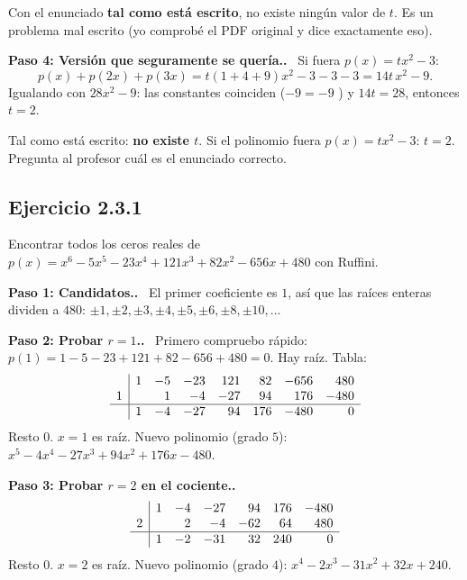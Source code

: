 \documentclass[11pt,a4paper]{article}
\newcommand{\paso}[1]{\par\medskip\noindent\textbf{\textcolor{blue!50!black}{Paso #1.}}\ }
\begin{document}
\begin{cuidado}
Con el enunciado \textbf{tal como está escrito}, no existe ningún valor de $t$. Es un problema mal escrito (yo comprobé el PDF original y dice exactamente eso).
\end{cuidado}

\paso{4: Versión que seguramente se quería.} Si fuera $p(x)=tx^2-3$:
\[ p(x)+p(2x)+p(3x)=t\left(1+4+9\right)x^2-3-3-3=14t\,x^2-9. \]
Igualando con $28x^2-9$: las constantes coinciden ($-9=-9$ \checkmark) y $14t=28$, entonces $t=2$.

\begin{respuesta}
Tal como está escrito: \textbf{no existe $t$}. Si el polinomio fuera $p(x)=tx^2-3$: $t=2$. Pregunta al profesor cuál es el enunciado correcto.
\end{respuesta}

\subsection{Ejercicio 2.3.1}
\begin{enunciado}
Encontrar todos los ceros reales de $p(x)=x^6-5x^5-23x^4+121x^3+82x^2-656x+480$ con Ruffini.
\end{enunciado}

\paso{1: Candidatos.} El primer coeficiente es $1$, así que las raíces enteras dividen a $480$:
$\pm1,\pm2,\pm3,\pm4,\pm5,\pm6,\pm8,\pm10,\dots$

\paso{2: Probar $r=1$.} Primero compruebo rápido: $p(1)=1-5-23+121+82-656+480=0$. Hay raíz. Tabla:
\[
\begin{array}{r|rrrrrrr}
 & 1 & -5 & -23 & 121 & 82 & -656 & 480\\
1 & & 1 & -4 & -27 & 94 & 176 & -480\\ \hline
 & 1 & -4 & -27 & 94 & 176 & -480 & 0
\end{array}
\]
Resto $0$. $x=1$ es raíz. Nuevo polinomio (grado $5$): $x^5-4x^4-27x^3+94x^2+176x-480$.

\paso{3: Probar $r=2$ en el cociente.}
\[
\begin{array}{r|rrrrrr}
 & 1 & -4 & -27 & 94 & 176 & -480\\
2 & & 2 & -4 & -62 & 64 & 480\\ \hline
 & 1 & -2 & -31 & 32 & 240 & 0
\end{array}
\]
Resto $0$. $x=2$ es raíz. Nuevo polinomio (grado $4$): $x^4-2x^3-31x^2+32x+240$.
\end{document}
